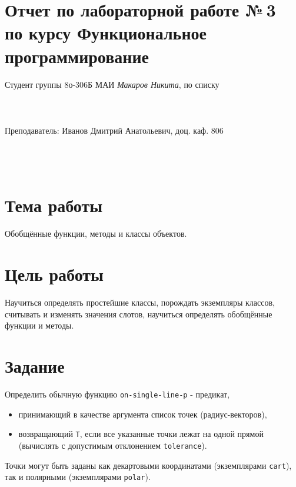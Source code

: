 \documentclass[a4paper, 12pt]{article}
\begin{document}
\section*{Отчет по лабораторной работе №\,3
\\по курсу \guillemotleft  Функциональное программирование\guillemotright}

\begin{flushright}
Студент группы 8о-306Б МАИ \textit{Макаров Никита},  по списку \\
 \\
 \\
\ \\
Преподаватель: Иванов Дмитрий Анатольевич, доц. каф. 806 \\
 \\
 \\
 \\

\end{flushright}


\section{Тема работы}
Обобщённые функции, методы и классы объектов.

\section{Цель работы}
Научиться определять простейшие классы, порождать экземпляры классов, считывать и изменять значения слотов, научиться определять обобщённые функции и методы.

\section{Задание}
Определить обычную функцию {\tt on-single-line-p} - предикат,
\begin{itemize}
\item принимающий в качестве аргумента список точек (радиус-векторов),
\item возвращающий {\tt T}, если все указанные точки лежат на одной прямой (вычислять с допустимым отклонением {\tt tolerance}).
\end{itemize}
Точки могут быть заданы как декартовыми координатами (экземплярами {\tt cart}), так и полярными (экземплярами {\tt polar}).
\end{document}

